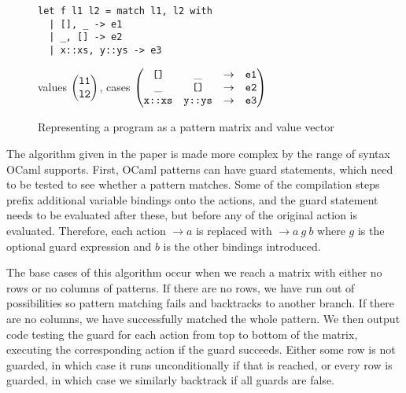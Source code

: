 \begin{figure}[H]
\begin{minipage}{0.45\textwidth}
\begin{verbatim}
let f l1 l2 = match l1, l2 with
  | [], _ -> e1
  | _, [] -> e2
  | x::xs, y::ys -> e3
\end{verbatim}
\end{minipage}
\begin{minipage}{0.55\textwidth}
 values $\begin{pmatrix}
\verb|l1| \\
\verb|l2|
\end{pmatrix}$, cases
$\begin{pmatrix}
\verb|[]| & \_ & \to & \verb|e1| \\
\_ & \verb|[]| & \to & \verb|e2| \\
\verb|x::xs| & \verb|y::ys| & \to & \verb|e3| \\
\end{pmatrix}$
\end{minipage}
\caption{Representing a program as a pattern matrix and value vector}
\end{figure}

The algorithm given in the paper is made more complex by the range of syntax OCaml supports. %
First, OCaml patterns can have guard statements, which need to be tested to see whether a pattern matches. Some of the compilation steps prefix additional variable bindings onto the actions, and the guard statement needs to be evaluated after these, but before any of the original action is evaluated. Therefore, each action $\to a$ is replaced with $\to a \ g \ b$ where $g$ is the optional guard expression and $b$ is the other bindings introduced.

The base cases of this algorithm occur when we reach a matrix with either no rows or no columns of patterns. If there are no rows, we have run out of possibilities so pattern matching fails and backtracks to another branch. If there are no columns, we have successfully matched the whole pattern. We then output code testing the guard for each action from top to bottom of the matrix, executing the corresponding action if the guard succeeds. Either some row is not guarded, in which case it runs unconditionally if that is reached, or every row is guarded, in which case we similarly backtrack if all guards are false.

